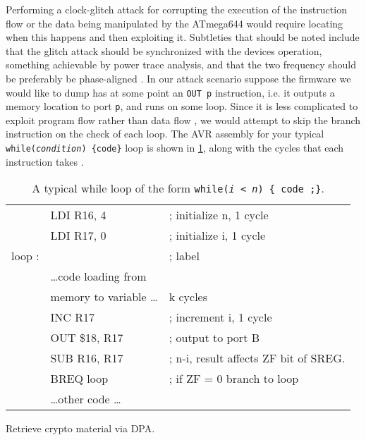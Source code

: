 Performing a clock-glitch attack for corrupting the execution of the instruction flow or the data being manipulated by the ATmega644 would require locating when this happens and then exploiting it. Subtleties that should be noted include that the glitch attack should be synchronized with the devices operation, something achievable by power trace analysis, and that the two frequency should be preferably be phase-aligned \citep{glitches_paper}. In our attack scenario suppose the firmware we would like to dump has at some point an \texttt{OUT p} instruction, i.e. it outputs a memory location to port \texttt{p}, and runs on some loop. Since it is less complicated to exploit program flow rather than data flow \citep{glitches_paper}, we would attempt to skip the branch instruction on the check of each loop. The AVR assembly for your typical  \texttt{while(\emph{condition}) \{code\}} loop is shown in \ref{tab:while}, along with the cycles that each instruction takes \citep{atmega_manual}.

\begin{table}
\caption{\footnotesize A typical while loop of the form \texttt{while(\emph{i < n}) \{ code ;\}}.}
\label{tab:while}
\center
\begin{tabular}{ l l l }
&LDI R16, 4 & ; initialize n, 1 cycle\\
&LDI R17, 0 & ; initialize i, 1 cycle \\
loop :  & & ; label\\
& \dots code loading from  &\\
& memory to variable \dots & k cycles\\

& INC R17 & ; increment i, 1 cycle \\
& OUT \$18, R17 & ; output to port B\\
& SUB R16, R17 & ; n-i, result affects ZF bit of SREG.\\
& BREQ loop & ; if ZF = 0 branch to loop\\
& \dots other code \dots & \\
\end{tabular}
\end{table}

Retrieve crypto material via DPA.
